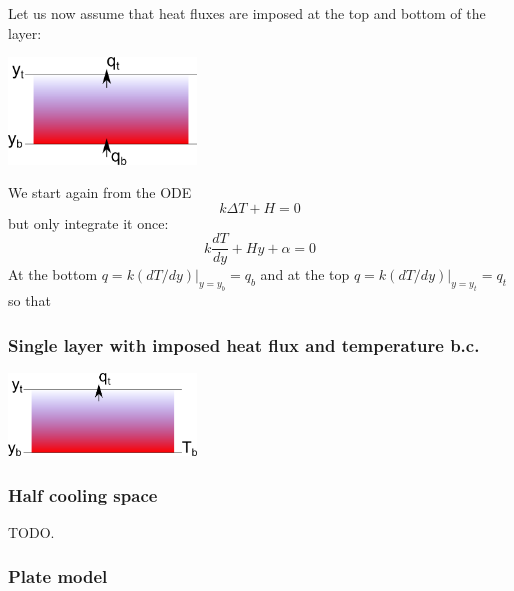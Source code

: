 Let us now assume that heat fluxes are imposed at the top and bottom of the layer:
\begin{center} 
\includegraphics[width=5cm]{images/initial_temperature/tempcond2.png}
\end{center}

We start again from the ODE
\[
k \Delta T + H = 0 
\]
but only integrate it once:
\[
k \frac{dT}{dy}  + H y + \alpha  = 0 
\]
At the bottom $q=k(dT/dy)|_{y=y_b} = q_b$ and at the top
$q=k(dT/dy)|_{y=y_t} = q_t$ so that 



 
\subsubsection{Single layer with imposed heat flux and temperature b.c. }

\begin{center}
\includegraphics[width=5cm]{images/initial_temperature/tempcond3.png}
\end{center}



\subsubsection{Half cooling space}

TODO. 

\Literature \cite{fagm12} 

\subsubsection{Plate model}

